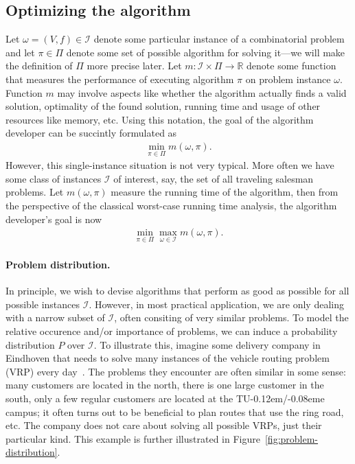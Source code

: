 \documentclass[a4paper]{report}
\theoremstyle{definition}
\theoremstyle{plain}
\newcommand{\TUE}{TU\kern-0.12em/\kern-0.08eme }
\begin{document}
\subsection{Optimizing the algorithm}

%
Let $\omega = (V, f) \in \mathcal{I}$ denote some particular instance of a
combinatorial problem and let $\pi \in \Pi$ denote some set of possible
algorithm for solving it---we will make the definition of $\Pi$ more precise
later.
%
Let $m : \mathcal{I} \times \Pi \rightarrow \mathbb{R}$ denote some function
that measures the performance of executing algorithm $\pi$ on problem instance
$\omega$. Function $m$ may involve aspects like whether the algorithm actually finds
a valid solution, optimality of the found solution, running time and usage of
other resources like memory, etc.
%
Using this notation, the goal of the algorithm developer can be succintly
formulated as
\begin{align}
  \min_{\pi \in \Pi} m(\omega, \pi) .
\end{align}
However, this single-instance situation is not very typical. More often we have
some class of instances $\mathcal{I}$ of interest, say, the set of all traveling
salesman problems.
%
Let $m(\omega, \pi)$ measure the running time of the algorithm, then from the
perspective of the classical worst-case running time analysis, the algorithm
developer's goal is now
\begin{align}
  \label{eq:min-max-runtime}
  \min_{\pi \in \Pi} \max_{\omega \in \mathcal{I}} m(\omega, \pi) .
\end{align}

\paragraph{Problem distribution.}

In principle, we wish to devise algorithms that perform as good as possible for
all possible instances $\mathcal{I}$. However, in most practical application, we
are only dealing with a narrow subset of $\mathcal{I}$, often consiting of very
similar problems.
%
To model the relative occurence and/or importance of problems, we can induce a
probability distribution $P$ over $\mathcal{I}$.
%
To illustrate this, imagine some delivery company in Eindhoven that needs to
solve many instances of the vehicle routing problem (VRP) every day~\cite{bengioMachineLearningCombinatorial2020}. The
problems they encounter are often similar in some sense: many customers are
located in the north, there is one large customer in the south, only a few
regular customers are located at the \TUE campus; it often turns out to be
beneficial to plan routes that use the ring road, etc. The company does not care
about solving all possible VRPs, just their particular kind. This example is
further illustrated in Figure~\ref{fig:problem-distribution}.
\end{document}
